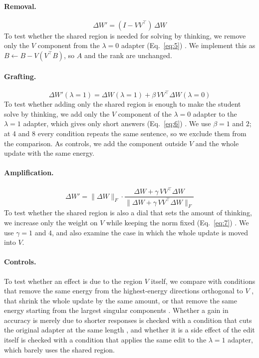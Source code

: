 \paragraph{Removal.}
\begin{equation}
\Delta W' = (I - VV^\top)\,\Delta W
\label{eq:5}
\end{equation}
To test whether the shared region is needed for solving by thinking, we remove only the $V$ component from the $\lambda=0$ adapter (Eq.~\eqref{eq:5}) \citep{arditi2024refusal}.
We implement this as $B \leftarrow B - V(V^\top B)$, so $A$ and the rank are unchanged.

\paragraph{Grafting.}
\begin{equation}
\Delta W'(\lambda{=}1) = \Delta W(\lambda{=}1) + \beta\, VV^\top \Delta W(\lambda{=}0)
\label{eq:6}
\end{equation}
To test whether adding only the shared region is enough to make the student solve by thinking, we add only the $V$ component of the $\lambda=0$ adapter to the $\lambda=1$ adapter, which gives only short answers (Eq.~\eqref{eq:6}) \citep{arditi2024refusal}.
We use $\beta=1$ and $2$; at 4 and 8 every condition repeats the same sentence, so we exclude them from the comparison. As controls, we add the component outside $V$ and the whole update with the same energy.

\paragraph{Amplification.}
\begin{equation}
\Delta W' = \lVert \Delta W \rVert_F \cdot \dfrac{\Delta W + \gamma\, VV^\top \Delta W}{\lVert \Delta W + \gamma\, VV^\top \Delta W \rVert_F}
\label{eq:7}
\end{equation}
To test whether the shared region is also a dial that sets the amount of thinking, we increase only the weight on $V$ while keeping the norm fixed (Eq.~\eqref{eq:7}) \citep{ma2025cotvalve,galichin2026covered,sheng2025planning}.
We use $\gamma=1$ and $4$, and also examine the case in which the whole update is moved into $V$.

\paragraph{Controls.}
To test whether an effect is due to the region $V$ itself, we compare with conditions that remove the same energy from the highest-energy directions orthogonal to $V$ \citep{lion2025polar,fu2026scalpel}, that shrink the whole update by the same amount, or that remove the same energy starting from the largest singular components \citep{lee2025goldswitch}.
Whether a gain in accuracy is merely due to shorter responses is checked with a condition that cuts the original adapter at the same length \citep{muennighoff2025s1}, and whether it is a side effect of the edit itself is checked with a condition that applies the same edit to the $\lambda=1$ adapter, which barely uses the shared region.

